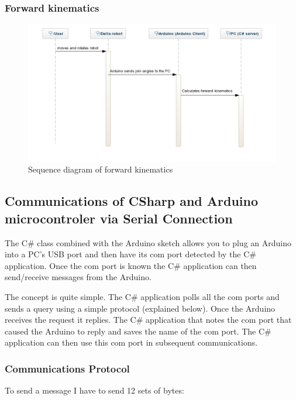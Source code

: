 \subsubsection{Forward kinematics}
\begin{figure}[H]
	\centering
	\includegraphics[width=\maxwidth{15cm}, keepaspectratio]{Chapters/Fig/forward_kinematics_sequence_diagram.png}
	\caption{Sequence diagram of forward kinematics}
	\label{fig:forward_kinematics_sequence_diagram}
\end{figure}

\subsection{Communications of CSharp and Arduino microcontroler via Serial Connection}
The C\# class combined with the Arduino sketch allows you to plug an Arduino into a PC's USB port and then have its com port detected by the C\# application. Once the com port is known the C\# application can then send/receive messages from the Arduino.

The concept is quite simple. The C\# application polls all the com ports and sends a query using a simple protocol (explained below). Once the Arduino receives the request it replies. The C\# application that notes the com port that caused the Arduino to reply and saves the name of the com port. The C\# application can then use this com port in subsequent communications.

\subsubsection{Communications Protocol}
To send a message I have to send 12 sets of bytes:

